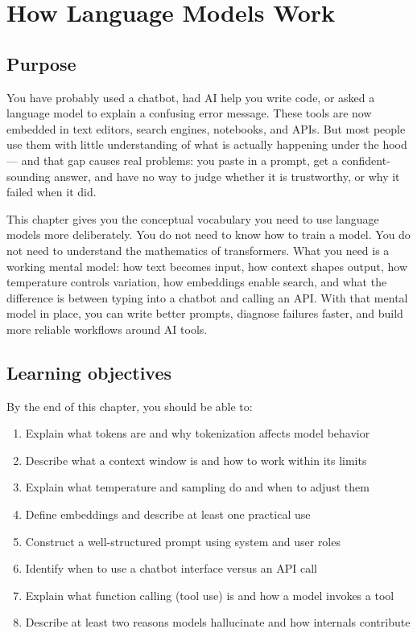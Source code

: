 \chapter{How Language Models Work}
\label{ch:llm-internals}

\section*{Purpose}

You have probably used a chatbot, had AI help you write code, or asked a language model to explain a confusing error message. These tools are now embedded in text editors, search engines, notebooks, and APIs. But most people use them with little understanding of what is actually happening under the hood --- and that gap causes real problems: you paste in a prompt, get a confident-sounding answer, and have no way to judge whether it is trustworthy, or why it failed when it did.

This chapter gives you the conceptual vocabulary you need to use language models more deliberately. You do not need to know how to train a model. You do not need to understand the mathematics of transformers. What you need is a working mental model: how text becomes input, how context shapes output, how temperature controls variation, how embeddings enable search, and what the difference is between typing into a chatbot and calling an API. With that mental model in place, you can write better prompts, diagnose failures faster, and build more reliable workflows around AI tools.

\section*{Learning objectives}

By the end of this chapter, you should be able to:

\begin{enumerate}[noitemsep,topsep=0pt]
  \item Explain what tokens are and why tokenization affects model behavior
  \item Describe what a context window is and how to work within its limits
  \item Explain what temperature and sampling do and when to adjust them
  \item Define embeddings and describe at least one practical use
  \item Construct a well-structured prompt using system and user roles
  \item Identify when to use a chatbot interface versus an API call
  \item Explain what function calling (tool use) is and how a model invokes a tool
  \item Describe at least two reasons models hallucinate and how internals contribute
\end{enumerate}

